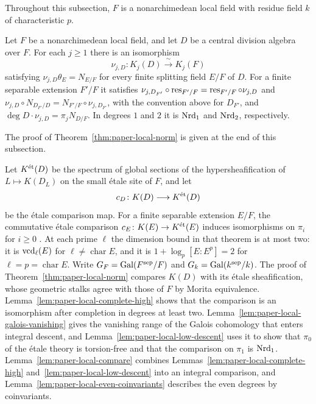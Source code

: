 Throughout this subsection, $F$ is a nonarchimedean local field with residue field $k$ of characteristic $p$.

\begin{theorem}\label{thm:paper-local-norm}
Let $F$ be a nonarchimedean local field, and let $D$ be a central division algebra over $F$.
For each $j\ge1$ there is an isomorphism
\[
 \nu_{j,D}\colon K_j(D)\xrightarrow{\ \sim\ }K_j(F)
\]
satisfying $\nu_{j,D}\theta_E=N_{E/F}$ for every finite splitting field $E/F$ of $D$.
For a finite separable extension $F'/F$ it satisfies $\nu_{j,D_{F'}}\circ\operatorname{res}_{F'/F}=\operatorname{res}_{F'/F}\circ\nu_{j,D}$ and $\nu_{j,D}\circ N_{D_{F'}/D}=N_{F'/F}\circ\nu_{j,D_{F'}}$, with the convention above for $D_{F'}$, and $\deg D\cdot\nu_{j,D}=\pi_jN_{D/F}$.
In degrees $1$ and $2$ it is $\operatorname{Nrd}_1$ and $\operatorname{Nrd}_2$, respectively.
\end{theorem}
The proof of Theorem~\ref{thm:paper-local-norm} is given at the end of this subsection.

Let $K^{\mathrm{\acute et}}(D)$ be the spectrum of global sections of the hypersheafification of $L\mapsto K(D_L)$ on the small \'etale site of $F$, and let
\[
 c_D\colon K(D)\longrightarrow K^{\mathrm{\acute et}}(D)
\]
be the \'etale comparison map.
For a finite separable extension $E/F$, the commutative \'etale comparison $c_E\colon K(E)\to K^{\mathrm{\acute et}}(E)$ induces isomorphisms on $\pi_i$ for $i\ge0$ \cite[Theorems 7.12(2) and 7.13]{ClausenMathew}.
At each prime $\ell$ the dimension bound in that theorem is at most two: it is $\operatorname{vcd}_\ell(E)$ for $\ell\ne\operatorname{char}E$, and it is $1+\log_p[E:E^p]=2$ for $\ell=p=\operatorname{char}E$.
Write $G_F=\operatorname{Gal}(F^{\mathrm{sep}}/F)$ and $G_k=\operatorname{Gal}(k^{\mathrm{sep}}/k)$.
The proof of Theorem~\ref{thm:paper-local-norm} compares $K(D)$ with its \'etale sheafification, whose geometric stalks agree with those of $F$ by Morita equivalence.
Lemma~\ref{lem:paper-local-complete-high} shows that the comparison is an isomorphism after completion in degrees at least two.
Lemma~\ref{lem:paper-local-galois-vanishing} gives the vanishing range of the Galois cohomology that enters integral descent, and Lemma~\ref{lem:paper-local-low-descent} uses it to show that $\pi_0$ of the \'etale theory is torsion-free and that the comparison on $\pi_1$ is $\operatorname{Nrd}_1$.
Lemma~\ref{lem:paper-local-compare} combines Lemmas~\ref{lem:paper-local-complete-high} and~\ref{lem:paper-local-low-descent} into an integral comparison, and Lemma~\ref{lem:paper-local-even-coinvariants} describes the even degrees by coinvariants.

